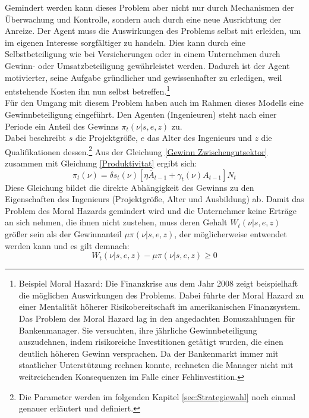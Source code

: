 Gemindert werden kann dieses Problem aber nicht nur durch Mechanismen der Überwachung und Kontrolle, sondern auch durch eine neue Ausrichtung der Anreize. Der Agent muss die Auswirkungen des Problems selbst mit erleiden, um im eigenen Interesse sorgfältiger zu handeln. Dies kann durch eine Selbstbeteiligung wie bei Versicherungen oder in einem Unternehmen durch Gewinn- oder Umsatzbeteiligung gewährleistet werden. Dadurch ist der Agent motivierter, seine Aufgabe gründlicher und gewissenhafter zu erledigen, weil entstehende Kosten ihn nun selbst betreffen.\footnote{Beispiel Moral Hazard: Die Finanzkrise aus dem Jahr 2008 zeigt beispielhaft die möglichen Auswirkungen des Problems. Dabei führte der Moral Hazard zu einer Mentalität höherer Risikobereitschaft im amerikanischen Finanzsystem. Das Problem des Moral Hazard lag in den angedachten Bonuszahlungen für Bankenmanager. Sie versuchten, ihre jährliche Gewinnbeteiligung auszudehnen, indem risikoreiche Investitionen getätigt wurden, die einen deutlich höheren Gewinn versprachen. Da der Bankenmarkt immer mit staatlicher Unterstützung rechnen konnte, rechneten die Manager nicht mit weitreichenden Konsequenzen im Falle einer Fehlinvestition.}\\
%
Für den Umgang mit diesem Problem haben auch \cite{Acemoglu.2006} im Rahmen dieses Modells eine Gewinnbeteiligung eingeführt. Den Agenten (Ingenieuren) steht nach einer Periode ein Anteil des Gewinns $\pi_t(\nu|s,e,z)$ zu.\\
%
Dabei beschreibt $s$ die Projektgröße, $e$ das Alter des Ingenieurs und $z$ die Qualifikationen dessen.\footnote{Die Parameter werden im folgenden Kapitel \ref{sec:Strategiewahl} noch einmal genauer erläutert und definiert.}  Aus der Gleichung  \eqref{Gewinn Zwischengutsektor} zusammen mit Gleichung \eqref{Produktivitat} ergibt sich:
%	
	\begin{equation}
		\pi_t(\nu)=\delta s_t(\nu)[\eta\overline{A}_{t-1}+\gamma_t(\nu)A_{t-1}]N_t
	\end{equation}
%
Diese Gleichung bildet die direkte Abhängigkeit des Gewinns zu den Eigenschaften des Ingenieurs (Projektgröße, Alter und Ausbildung) ab.  Damit das Problem des Moral Hazards gemindert wird und die Unternehmer keine Erträge an sich nehmen, die ihnen nicht zustehen, muss deren Gehalt $W_t(\nu|s,e,z)$ größer sein als der Gewinnanteil $\mu\pi(\nu|s,e,z)$, der möglicherweise entwendet werden kann und es gilt demnach:
%
	\begin{equation}
		W_t(\nu|s,e,z)-\mu\pi(\nu|s,e,z)\geq 0
	\end{equation}
